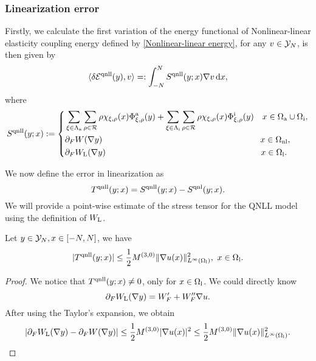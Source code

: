 
\subsubsection{Linearization error}

Firstly, we calculate the first variation of the energy functional of Nonlinear-linear elasticity coupling energy defined by \eqref{Nonlinear-linear energy}, for any $v\in\mathcal{Y}_N$, is then given by
\begin{equation*}
	\langle \delta \mathcal{E}^{{\rm qnll}} (y),v\rangle=:\int_{-N}^{N} S^{{\rm qnll}}(y;x)\nabla v\,\text{d} x,
\end{equation*}
where
\begin{equation}\label{LInearization stress tensor}
	S^{{\rm qnll}}(y;x) := \left\{
	\begin{aligned}
		&\sum_{\xi \in \Lambda_{\rm a}}\sum_{\rho \in \mathcal{R}}\rho \chi_{\xi,\rho}(x) \Phi^{{\rm a}}_{\xi,\rho}(y) +\sum_{\xi \in \Lambda_{\rm i}}\sum_{\rho \in \mathcal{R}}\rho \chi_{\xi,\rho}(x) \Phi^{{\rm i}}_{\xi,\rho}(y) \quad x\in \Omega_{{\rm a}} \cup \Omega_{{\rm i}}, \\
		&\partial_{F}W(\nabla y) \qquad \qquad \qquad \qquad \qquad \qquad \qquad \qquad \quad  \quad~~ x\in \Omega_{{\rm nl}},\\
		&\partial_{F}W_{\text{L}}(\nabla y) \qquad \qquad \qquad \qquad \qquad \qquad \qquad \qquad \qquad~ x\in \Omega_{{\rm l}}.
	\end{aligned}
	\right.
\end{equation}

We now define the error in linearization as
\begin{equation*}
	T^{{\rm qnll}}(y;x)=S^{{\rm qnll}}(y;x)-S^{{\rm qnl}}(y;x).
\end{equation*}
We will provide a point-wise estimate of the stress tensor for the QNLL model using the definition of $W_{{\rm L}}$.

\begin{theorem}
	Let $y\in \mathcal{Y}_N,x\in[-N,N]$, we have
	\begin{equation}\label{Pointwise NLL stress tensor}
		\vert T^{{\rm qnll}}(y;x)\vert \le \frac{1}{2}M^{(3,0)} \Vert \nabla u(x)\Vert^{2}_{L^{\infty}(\Omega_{{\rm l}})}, \ x\in \Omega_{{\rm l}}.
	\end{equation}
\end{theorem}

\begin{proof}
	We notice that $T^{{\rm qnll}}(y;x) \neq 0$, only for $x\in \Omega_{{\rm l}}$. We could directly know
	\begin{equation*}
		\partial_{F}W_{{\rm L}}(\nabla y) = W^{\prime}_F+W^{\prime \prime}_F\nabla u.
	\end{equation*}
	After using the Taylor's expansion, we obtain
	\begin{equation*}
		\vert \partial_{F}W_{\text{L}} (\nabla y)-\partial_{F}W(\nabla y)\vert \le \frac{1}{2} M^{(3,0)} \vert \nabla u(x)\vert^{2}\le\frac{1}{2}M^{(3,0)}\Vert \nabla u(x)\Vert^{2}_{L^{\infty}(\Omega_{{\rm l}})}.
	\end{equation*}
\end{proof}


